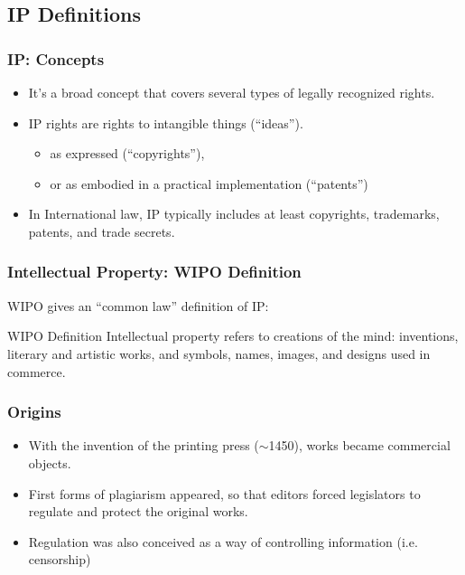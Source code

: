\subsection{IP Definitions}
\begin{frame}
\frametitle{IP: Concepts}

\begin{itemize}
\item It's a broad concept that covers several types of legally recognized rights.
\item IP rights are rights to \alert{intangible things} (``ideas'').
	\begin{itemize}
   \item as expressed (``copyrights''), 
   \item or as embodied in a practical implementation (``patents'')
	\end{itemize}
\item In International law, IP typically includes at least \alert{copyrights}, \alert{trademarks}, \alert{patents}, and \alert{trade secrets}.

\end{itemize}

\end{frame}



\begin{frame}
\frametitle{Intellectual Property: WIPO Definition}

\textsc{WIPO} gives an ``common law'' definition of IP:

\begin{block}{WIPO Definition}
  Intellectual property refers to creations of the mind:
  inventions, literary and artistic works, and symbols, names, images,
  and designs used in commerce.
\end{block}

\end{frame}


\begin{frame}
\frametitle{Origins}

\begin{itemize}
\item With the invention of the printing press ($\sim$1450), works became commercial objects.
\item First forms of plagiarism appeared, so that editors forced legislators
to regulate and protect the original works.
\item Regulation was also conceived as a way of controlling information (i.e. censorship)
\end{itemize}

\end{frame}

